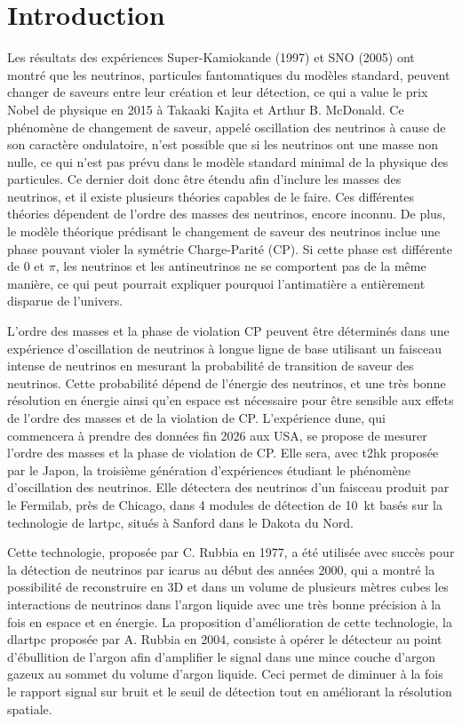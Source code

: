 \chapter{Introduction}

Les résultats des expériences Super-Kamiokande (1997) et SNO (2005) ont montré que les neutrinos, particules fantomatiques du modèles standard, peuvent changer de saveurs entre leur création et leur détection, ce qui a value le prix Nobel de physique en 2015 à Takaaki Kajita et Arthur B. McDonald.  Ce phénomène de changement de saveur, appelé oscillation des neutrinos à cause de son caractère ondulatoire, n'est possible que si les neutrinos ont une masse non nulle, ce qui n'est pas prévu dans le modèle standard minimal de la physique des particules. Ce dernier doit donc être étendu afin d'inclure les masses des neutrinos, et il existe plusieurs théories capables de le faire. Ces différentes théories dépendent de l'ordre des masses des neutrinos, encore inconnu. De plus, le modèle théorique prédisant le changement de saveur des neutrinos inclue une phase pouvant violer la symétrie Charge-Parité (CP). Si cette phase est différente de 0 et $\pi$, les neutrinos et les antineutrinos ne se comportent pas de la même manière, ce qui peut pourrait expliquer pourquoi l'antimatière a entièrement disparue de l'univers. 

L'ordre des masses et la phase de violation CP peuvent être déterminés dans une expérience d'oscillation de neutrinos à longue ligne de base utilisant un faisceau intense de neutrinos en mesurant la probabilité de transition de saveur des neutrinos. Cette probabilité dépend de l'énergie des neutrinos, et une très bonne résolution en énergie ainsi qu'en espace est nécessaire pour être sensible aux effets de l'ordre des masses et de la violation de CP. L'expérience \acrshort{dune}, qui commencera à prendre des données fin 2026 aux USA, se propose de mesurer l'ordre des masses et la phase de violation de CP. Elle sera, avec \acrshort{t2hk} proposée par le Japon, la troisième génération d'expériences étudiant le phénomène d'oscillation des neutrinos. Elle détectera des neutrinos d'un faisceau produit par le Fermilab, près de Chicago, dans 4 modules de détection de \SI{10}{\kilo\tonne} basés sur la technologie de \gls{lartpc}, situés à Sanford dans le Dakota du Nord.

Cette technologie, proposée par C. Rubbia en 1977, a été utilisée avec succès pour la détection de neutrinos par \acrshort{icarus} au début des années 2000, qui a montré la possibilité de reconstruire en 3D et dans un volume de plusieurs mètres cubes les interactions de neutrinos dans l'argon liquide avec une très bonne précision à la fois en espace et en énergie. La proposition d'amélioration de cette technologie, la \gls{dlartpc} proposée par A. Rubbia en 2004, consiste à opérer le détecteur au point d'ébullition de l'argon afin d'amplifier le signal dans une mince couche d'argon gazeux au sommet du volume d'argon liquide. Ceci permet de diminuer à la fois le rapport signal sur bruit et le seuil de détection tout en améliorant la résolution spatiale. 


